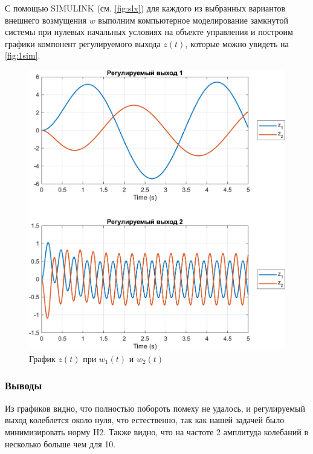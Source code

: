 С помощью SIMULINK (см. \autoref{fig:slx}) для каждого из выбранных вариантов внешнего возмущения $w$ выполним 
компьютерное моделирование замкнутой системы при нулевых начальных условиях
на объекте управления и построим графики компонент регулируемого выхода
$z(t)$, которые можно увидеть на \autoref{fig:1sim}.
\begin{figure}[H]
    \centering
    \includegraphics[width=1\linewidth]{figs/1_sim.png}
    \caption{График $z(t)$ при $w_1(t)$ и $w_2(t)$}
    \label{fig:1sim}
\end{figure}

\subsubsection{Выводы}

Из графиков видно, что полностью побороть помеху не удалось, и регулируемый выход 
колеблется около нуля, что естественно, так как нашей задачей было минимизировать норму H2. Также видно, что на 
частоте 2 амплитуда колебаний  в несколько больше чем для 10.



